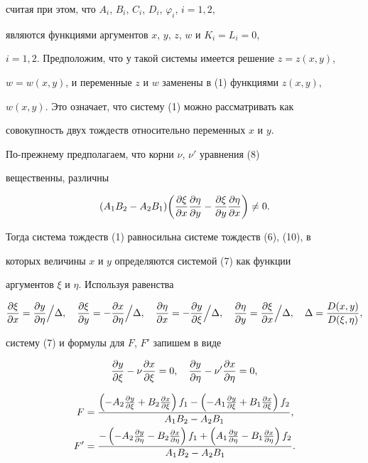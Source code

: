 считая при этом, что $A_i$, $B_i$, $C_i$, $D_i$, $\varphi_i$, $i=1,2$, 


являются функциями аргументов $x$, $y$, $z$, $w$ и $K_i=L_i=0$, 


$i=1,2$. Предположим, что у такой системы имеется решение $z=z(x,y)$, 


$w=w(x,y)$, и переменные $z$ и $w$ заменены в (1) функциями $z(x,y)$, 


$w(x,y)$. Это означает, что систему (1) можно рассматривать как 


совокупность двух тождеств относительно переменных $x$ и $y$. 


По-прежнему предполагаем, что корни $\nu$, $\nu'$ уравнения (8) 


вещественны, различны 


$$ 


(A_1B_2-A_2B_1)\bigg(\myfrac{\xi}{x}\myfrac{\eta}{y}- 


\myfrac{\xi}{y}\myfrac{\eta}{x} \bigg)\ne0. 


$$ 


Тогда система тождеств (1) равносильна системе тождеств (6), (10), в 


которых величины $x$ и $y$ определяются системой (7) как функции 


аргументов $\xi$ и $\eta$. Используя равенства 


$$


\myfrac{\xi}{x}=\myfrac{y}{\eta}\Big /\Delta,\quad 


\myfrac{\xi}{y}=-\myfrac{x}{\eta}\Big /\Delta,\quad 


\myfrac{\eta}{x}=-\myfrac{y}{\xi}\Big /\Delta, \quad


\myfrac{\eta}{y}=\myfrac{\xi}{x}\Big /\Delta,\quad 


\Delta=\frac{D(x,y)}{D(\xi,\eta)}, 


$$


систему (7) и формулы для $F$, $F'$ запишем в виде 


\begin{equation} 


\myfrac{y}{\xi}-\nu\myfrac{x}{\xi}=0,\quad 


\myfrac{y}{\eta}-\nu'\myfrac{x}{\eta}=0, 


\end{equation} 


\begin{align*} 


F&=\frac{\left(-A_2\myfrac{y}{\xi}+B_2\myfrac{x}{\xi}\right)f_1- 


\left(-A_1\myfrac{y}{\xi}+B_1\myfrac{x}{\xi}\right)f_2} 


{A_1B_2-A_2B_1}, \\ 


% 


F'&=\frac{-\left(-A_2\myfrac{y}{\eta}-B_2\myfrac{x}{\eta}\right)f_1+ 


\left(A_1\myfrac{y}{\eta}-B_1\myfrac{x}{\eta}\right)f_2} 


{A_1B_2-A_2B_1}.\end{align*} 


